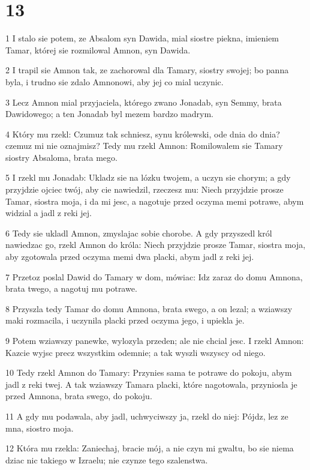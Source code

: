 \chapter{13}

\par 1 I stalo sie potem, ze Absalom syn Dawida, mial siostre piekna, imieniem Tamar, której sie rozmilowal Amnon, syn Dawida.
\par 2 I trapil sie Amnon tak, ze zachorowal dla Tamary, siostry swojej; bo panna byla, i trudno sie zdalo Amnonowi, aby jej co mial uczynic.
\par 3 Lecz Amnon mial przyjaciela, którego zwano Jonadab, syn Semmy, brata Dawidowego; a ten Jonadab byl mezem bardzo madrym.
\par 4 Który mu rzekl: Czumuz tak schniesz, synu królewski, ode dnia do dnia? czemuz mi nie oznajmisz? Tedy mu rzekl Amnon: Romilowalem sie Tamary siostry Absaloma, brata mego.
\par 5 I rzekl mu Jonadab: Ukladz sie na lózku twojem, a uczyn sie chorym; a gdy przyjdzie ojciec twój, aby cie nawiedzil, rzeczesz mu: Niech przyjdzie prosze Tamar, siostra moja, i da mi jesc, a nagotuje przed oczyma memi potrawe, abym widzial a jadl z reki jej.
\par 6 Tedy sie ukladl Amnon, zmyslajac sobie chorobe. A gdy przyszedl król nawiedzac go, rzekl Amnon do króla: Niech przyjdzie prosze Tamar, siostra moja, aby zgotowala przed oczyma memi dwa placki, abym jadl z reki jej.
\par 7 Przetoz poslal Dawid do Tamary w dom, mówiac: Idz zaraz do domu Amnona, brata twego, a nagotuj mu potrawe.
\par 8 Przyszla tedy Tamar do domu Amnona, brata swego, a on lezal; a wziawszy maki rozmacila, i uczynila placki przed oczyma jego, i upiekla je.
\par 9 Potem wziawszy panewke, wylozyla przeden; ale nie chcial jesc. I rzekl Amnon: Kazcie wyjsc precz wszystkim odemnie; a tak wyszli wszyscy od niego.
\par 10 Tedy rzekl Amnon do Tamary: Przynies sama te potrawe do pokoju, abym jadl z reki twej. A tak wziawszy Tamara placki, które nagotowala, przyniosla je przed Amnona, brata swego, do pokoju.
\par 11 A gdy mu podawala, aby jadl, uchwyciwszy ja, rzekl do niej: Pójdz, lez ze mna, siostro moja.
\par 12 Która mu rzekla: Zaniechaj, bracie mój, a nie czyn mi gwaltu, bo sie niema dziac nic takiego w Izraelu; nie czynze tego szalenstwa.
